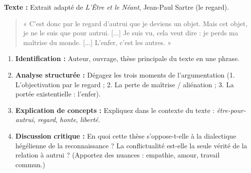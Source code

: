 \documentclass[11pt]{article}
\begin{document}
\begin{exercice}
\textbf{Texte :} Extrait adapté de \emph{L'Être et le Néant}, Jean-Paul Sartre (le regard).
\begin{quote}
« C'est donc par le regard d'autrui que je deviens un objet. Mais cet objet, je ne le suis que pour autrui. [...] Je suis vu, cela veut dire : je perds ma maîtrise du monde. [...] L'enfer, c'est les autres. »
\end{quote}
\begin{enumerate}
    \item \textbf{Identification :} Auteur, ouvrage, thèse principale du texte en une phrase.
    \item \textbf{Analyse structurée :} Dégagez les trois moments de l'argumentation (1. L'objectivation par le regard ; 2. La perte de maîtrise / aliénation ; 3. La portée existentielle : l'enfer).
    \item \textbf{Explication de concepts :} Expliquez dans le contexte du texte : \emph{être-pour-autrui}, \emph{regard}, \emph{honte}, \emph{liberté}.
    \item \textbf{Discussion critique :} En quoi cette thèse s'oppose-t-elle à la dialectique hégélienne de la reconnaissance ? La conflictualité est-elle la seule vérité de la relation à autrui ? (Apportez des nuances : empathie, amour, travail commun.)
\end{enumerate}
\end{exercice}
\end{document}
